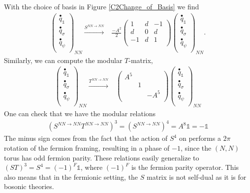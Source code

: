 \documentclass[12pt,a4paper]{article}
\newcounter{arrow}
\newcommand{\ra}{\rightarrow}
\newcommand{\unit}{\mathds{1}}
\begin{document}
With the choice of basis in Figure \ref{C2Change_of_Basis} we find
\begin{align}
\left( \begin{matrix}
\overset{\bullet}{q}_\unit\\
\overset{\bullet}{q}_\sigma\\
\overset{\bullet}{q}_\psi\\
\end{matrix} \right)_{NN} 
\xrightarrow{S^{NN \rightarrow NN}} &\frac{-A^2}{2} \left( \begin{matrix}
1& d&-1\\
d&0&d\\
-1& d&1\\
\end{matrix} \right)
\left( \begin{matrix}
\overset{\bullet}{q}_\unit\\
\overset{\bullet}{q}_\sigma\\
\overset{\bullet}{q}_\psi\\
\end{matrix} \right)_{NN}.
\label{NNSmatrix}
\end{align}
Similarly, we can compute the modular $T$-matrix, 
\begin{align}
\left( \begin{matrix}
\overset{\bullet}{q}_\unit\\
\overset{\bullet}{q}_\sigma\\
\overset{\bullet}{q}_\psi\\
\end{matrix} \right)_{NN} 
\xrightarrow{T^{NN \rightarrow NN}} &\left( \begin{matrix}
A^5& &\\
&1&\\
&&-A^5\\
\end{matrix} \right)
\left( \begin{matrix}
\overset{\bullet}{q}_\unit\\
\overset{\bullet}{q}_\sigma\\
\overset{\bullet}{q}_\psi\\
\end{matrix} \right)_{NN}
\end{align}
One can check that we have the modular relations
\begin{align}
 (S^{NN\ra NN}T^{NN\ra NN})^3 = (S^{NN \ra NN})^4= A^{8}\unit = -\unit
 \end{align}
The minus sign comes from the fact that the action of $S^4$ on performs a $2\pi$ rotation 
of the fermion framing, resulting in a phase of $-1$, since the $(N,N)$ torus has odd fermion parity. 
These relations easily generalize to $(ST)^3=S^4=(-1)^F\unit$, where $(-1)^F$ is the fermion 
parity operator. 
This also means that in the fermionic setting, 
the $S$ matrix is not self-dual as it is for bosonic theories.
\end{document}
